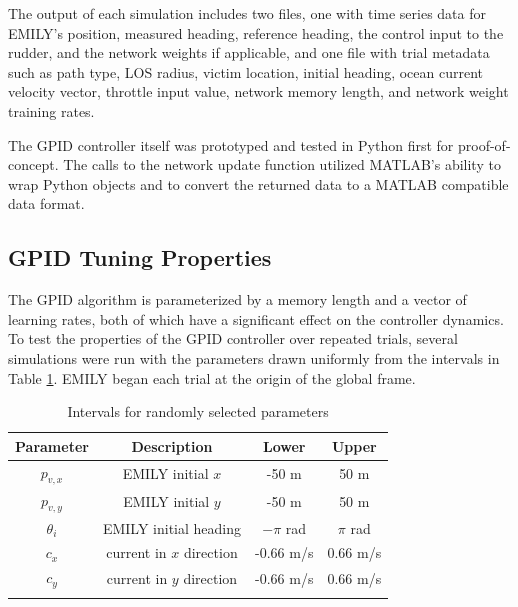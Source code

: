 \documentclass[conference]{IEEEtran}
\begin{document}
The output of each simulation includes two files, one with time series data for EMILY's position, measured heading, reference heading, the control input to the rudder, and the network weights if applicable, and one file with trial metadata such as path type, LOS radius, victim location, initial heading, ocean current velocity vector, throttle input value, network memory length, and network weight training rates.

The GPID controller itself was prototyped and tested in Python first for proof-of-concept. The calls to the network update function utilized MATLAB's ability to wrap Python objects and to convert the returned data to a MATLAB compatible data format.


\subsection{GPID Tuning Properties}
The GPID algorithm is parameterized by a memory length and a vector of learning rates, both of which have a significant effect on the controller dynamics. To test the properties of the GPID controller over repeated trials, several simulations were run with the parameters drawn uniformly from the intervals in Table \ref{table:parameters}. EMILY began each trial at the origin of the global frame.

\begin{table}[h]
\normalsize
\centering
\begin{tabular}{c c c c}
\rowcolor{gray!20}
Parameter & Description & Lower & Upper \\
\hline
$p_{v,x}$ & EMILY initial $x$ & -50 m & 50 m \\
$p_{v,y}$ & EMILY initial $y$ & -50 m & 50 m \\
$\theta_i$ & EMILY initial heading & $-\pi$ rad & $\pi$ rad \\
$c_x$ & current in $x$ direction & -0.66 m/s & 0.66 m/s \\
$c_y$ & current in $y$ direction & -0.66 m/s & 0.66 m/s \\
\hline
\\
\end{tabular}
\caption{Intervals for randomly selected parameters}\label{table:parameters}
\end{table}
\end{document}
